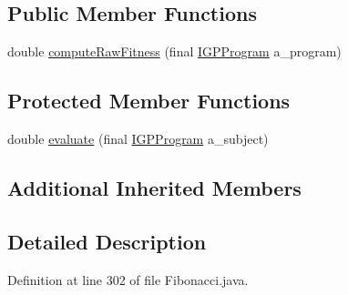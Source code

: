 \subsection*{Public Member Functions}
\begin{DoxyCompactItemize}
\item 
double \hyperlink{classexamples_1_1gp_1_1_fibonacci_1_1_formula_fitness_function_a223e3cdf4059c9783a54841061460a8c}{compute\-Raw\-Fitness} (final \hyperlink{interfaceorg_1_1jgap_1_1gp_1_1_i_g_p_program}{I\-G\-P\-Program} a\-\_\-program)
\end{DoxyCompactItemize}
\subsection*{Protected Member Functions}
\begin{DoxyCompactItemize}
\item 
double \hyperlink{classexamples_1_1gp_1_1_fibonacci_1_1_formula_fitness_function_a0dd9c158902692e6a0c76826be3378d8}{evaluate} (final \hyperlink{interfaceorg_1_1jgap_1_1gp_1_1_i_g_p_program}{I\-G\-P\-Program} a\-\_\-subject)
\end{DoxyCompactItemize}
\subsection*{Additional Inherited Members}


\subsection{Detailed Description}


Definition at line 302 of file Fibonacci.\-java.



